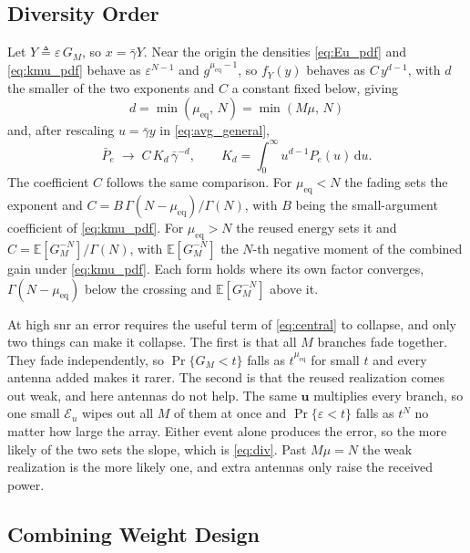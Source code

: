\documentclass[12pt, draftclsnofoot, onecolumn]{IEEEtran}
\newcommand{\Eu}{\mathcal{E}_u}
\newenvironment{revblock}{}{}
\begin{document}
\begin{revblock}
\subsection{Diversity Order}

Let $Y\triangleq \varepsilon\,G_M$, so $x=\bar\gamma Y$. Near the origin the
densities \eqref{eq:Eu_pdf} and \eqref{eq:kmu_pdf} behave as $\varepsilon^{N-1}$
and $g^{\mu_{\text{eq}}-1}$, so $f_Y(y)$ behaves as $C\,y^{d-1}$, with $d$ the
smaller of the two exponents and $C$ a constant fixed below, giving
\begin{equation}
d=\min\left(\mu_{\text{eq}},\,N\right)=\min\left(M\mu,\,N\right)
\label{eq:div}
\end{equation}
and, after rescaling $u=\bar\gamma y$ in \eqref{eq:avg_general},
\begin{equation}
\bar P_e \;\to\; C\,K_d\,\bar\gamma^{-d},
\qquad
K_d=\int_0^{\infty} u^{d-1}P_e(u)\,\mathrm{d}u .
\label{eq:asym}
\end{equation}
The coefficient $C$ follows the same comparison. For $\mu_{\text{eq}}<N$ the
fading sets the exponent and $C=B\,\Gamma(N-\mu_{\text{eq}})/\Gamma(N)$, with
$B$ being the small-argument coefficient of \eqref{eq:kmu_pdf}. For
$\mu_{\text{eq}}>N$ the reused energy sets it and
$C=\mathbb{E}[G_M^{-N}]/\Gamma(N)$, with $\mathbb{E}[G_M^{-N}]$ the $N$-th
negative moment of the combined gain under \eqref{eq:kmu_pdf}. Each form holds
where its own factor converges, $\Gamma(N-\mu_{\text{eq}})$ below the crossing
and $\mathbb{E}[G_M^{-N}]$ above it.

At high \ac{snr} an error requires the useful term of \eqref{eq:central} to
collapse, and only two things can make it collapse. The first is that all $M$
branches fade together. They fade independently, so $\Pr\{G_M<t\}$ falls as
$t^{\mu_{\text{eq}}}$ for small $t$ and every antenna added makes it rarer. The
second is that the reused realization comes out weak, and here antennas do not
help. The same $\mathbf{u}$ multiplies every branch, so one small $\Eu$ wipes
out all $M$ of them at once and $\Pr\{\varepsilon<t\}$ falls as $t^{N}$ no
matter how large the array. Either event alone produces the error, so the more
likely of the two sets the slope, which is \eqref{eq:div}. Past $M\mu=N$ the
weak realization is the more likely one, and extra antennas only raise the
received power.

\subsection{Combining Weight Design}


\end{revblock}
\end{document}
